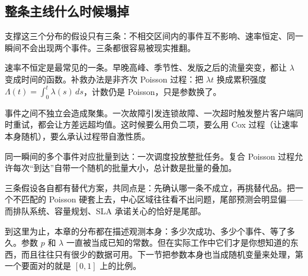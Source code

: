 \subsection{整条主线什么时候塌掉}

支撑这三个分布的假设只有三条：不相交区间内的事件互不影响、速率恒定、同一瞬间不会出现两个事件。三条都很容易被现实推翻。

速率不恒定是最常见的一条。早晚高峰、季节性、发版之后的流量突变，都让 \(\lambda\) 变成时间的函数。补救办法是非齐次 Poisson 过程：把 \(\lambda t\) 换成累积强度 \(\Lambda(t)=\int_0^t\lambda(s)\,ds\)，计数仍是 Poisson，只是参数换了。

事件之间不独立会造成聚集。一次故障引发连锁故障、一次超时触发整片客户端同时重试，都会让方差远超均值。这时候要么用负二项，要么用 Cox 过程（让速率本身随机），要么承认过程带自激性质。

同一瞬间的多个事件对应批量到达：一次调度投放整批任务。复合 Poisson 过程允许每次``到达''自带一个随机的批量大小，总计数是批量的叠加。

三条假设各自都有替代方案，共同点是：先确认哪一条不成立，再挑替代品。把一个不匹配的 Poisson 硬套上去，中心区域往往看不出问题，尾部预测会明显偏——而排队系统、容量规划、SLA 承诺关心的恰好是尾部。

到这里为止，本章的分布都在描述观测本身：多少次成功、多少个事件、等了多久。参数 \(p\) 和 \(\lambda\) 一直被当成已知的常数。但在实际工作中它们才是你想知道的东西，而且往往只有很少的数据可用。下一节把参数本身也当成随机变量来处理，第一个要面对的就是 \([0,1]\) 上的比例。
